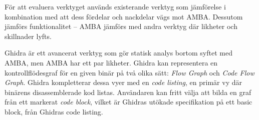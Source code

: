 



För att evaluera verktyget används existerande verktyg som jämförelse i
kombination med att dess fördelar och nackdelar vägs mot AMBA. Dessutom jämförs
funktionalitet -- AMBA jämförs med andra verktyg där likheter
och skillnader lyfts.

Ghidra är ett avancerat verktyg som gör statisk analys bortom syftet med AMBA,
men AMBA har ett par likheter. Ghidra kan representera en
kontrollflödesgraf för en given binär på två olika sätt: \textit{Flow
Graph} och \textit{Code Flow Graph}. Ghidra kompletterar dessa vyer
med en \textit{code listing}, en primär vy där binärens
disassemblerade kod listas. Användaren kan fritt välja att bilda en
graf från ett markerat \textit{code block}, vilket är Ghidras utökade
specifikation på ett basic block, från Ghidras code listing. 







